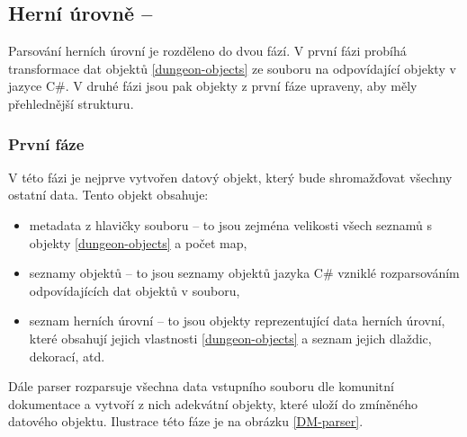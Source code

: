 
\subsection{Herní úrovně -- }\label{dungeon-parser}

Parsování herních úrovní je rozděleno do dvou fází. V první fázi probíhá transformace dat objektů \vref{dungeon-objects} ze souboru 
 na odpovídající objekty v jazyce C\#. V druhé fázi jsou pak objekty z první fáze upraveny,
aby měly přehlednější strukturu. 


\subsubsection{První fáze}

V této fázi je nejprve vytvořen datový objekt, který bude shromažďovat všechny ostatní data. Tento objekt obsahuje:

\begin{itemize}
\item metadata z hlavičky souboru -- to jsou zejména velikosti všech seznamů s objekty \vref{dungeon-objects} a počet map,
\item seznamy objektů -- to jsou seznamy objektů jazyka C\# vzniklé rozparsováním odpovídajících dat objektů v souboru,
\item seznam herních úrovní -- to jsou objekty reprezentující data herních úrovní, které obsahují jejich vlastnosti \vref{dungeon-objects}
 a seznam jejich dlaždic, dekorací, atd. 
\end{itemize}

Dále parser rozparsuje všechna data vstupního souboru dle komunitní dokumentace \cite{TechnicalDocumentationFontanel05} a vytvoří z nich 
adekvátní objekty, které uloží do zmíněného datového objektu. Ilustrace této fáze je na obrázku \ref{DM-parser}.

